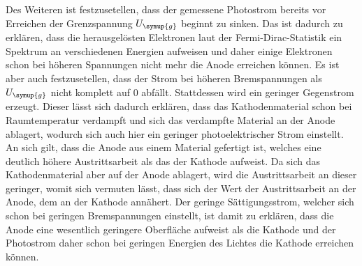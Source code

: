 Des Weiteren ist festzusetellen, dass der gemessene Photostrom bereits vor Erreichen der Grenzspannung $U_{\symup{g}}$ beginnt zu sinken.
Das ist dadurch zu erklären, dass die herausgelösten Elektronen laut der Fermi-Dirac-Statistik ein Spektrum an verschiedenen Energien aufweisen 
und daher einige Elektronen schon bei höheren Spannungen nicht mehr die Anode erreichen können. 
Es ist aber auch festzusetellen, dass der Strom bei höheren Bremspannungen als $U_{\symup{g}}$ nicht komplett auf 0 abfällt. Stattdessen 
wird ein geringer Gegenstrom erzeugt. Dieser lässt sich dadurch erklären, dass das Kathodenmaterial schon bei Raumtemperatur verdampft und
sich das verdampfte Material an der Anode ablagert, wodurch sich auch hier ein geringer photoelektrischer Strom einstellt. An sich gilt, dass
die Anode aus einem Material gefertigt ist, welches eine deutlich höhere Austrittsarbeit als das der Kathode aufweist. Da sich das Kathodenmaterial
aber auf der Anode ablagert, wird die Austrittsarbeit an dieser geringer, womit sich vermuten lässt, dass sich der Wert der Austrittsarbeit
an der Anode, dem an der Kathode annähert. Der geringe Sättigungsstrom, welcher sich schon bei geringen Bremspannungen einstellt,
ist damit zu erklären, dass die Anode eine wesentlich geringere Oberfläche aufweist als die Kathode und der Photostrom daher schon bei 
geringen Energien des Lichtes die Kathode erreichen können.